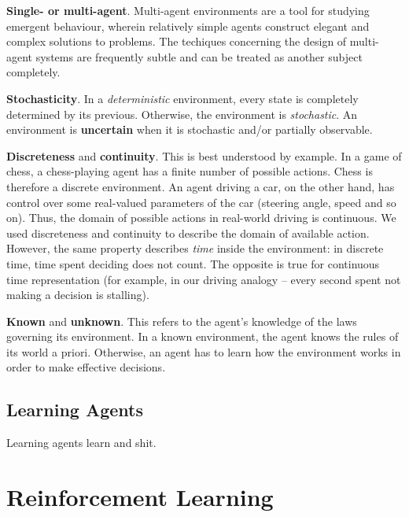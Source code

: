 \textbf{Single- or multi-agent}.
Multi-agent environments are a tool for studying emergent behaviour, wherein relatively simple agents construct elegant and complex solutions to problems.
The techiques concerning the design of multi-agent systems are frequently subtle and can be treated as another subject completely.

\textbf{Stochasticity}.
In a \emph{deterministic} environment, every state is completely determined by its previous. Otherwise, the environment is \emph{stochastic}. An environment is \textbf{uncertain} when it is stochastic and/or partially observable.

\textbf{Discreteness} and \textbf{continuity}.
This is best understood by example.
In a game of chess, a chess-playing agent has a finite number of possible actions.
Chess is therefore a discrete environment.
An agent driving a car, on the other hand, has control over some real-valued parameters of the car (steering angle, speed and so on).
Thus, the domain of possible actions in real-world driving is continuous.
We used discreteness and continuity to describe the domain of available action.
However, the same property describes \emph{time} inside the environment: in discrete time, time spent deciding does not count. The opposite is true for continuous time representation (for example, in our driving analogy -- every second spent not making a decision is stalling).

\textbf{Known} and \textbf{unknown}.
This refers to the agent's knowledge of the laws governing its environment. In a known environment, the agent knows the rules of its world a priori. Otherwise, an agent has to learn how the environment works in order to make effective decisions.

\subsection{Learning Agents} \label{learning-agents}
Learning agents learn and shit.


\section{Reinforcement Learning} \label{reinforcement-learning}

